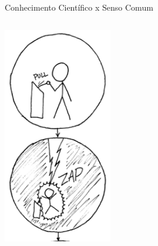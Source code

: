 \documentclass{beamer}
\begin{document}
\begin{frame}{Conhecimento Científico x Senso Comum}
  \begin{columns}
    \begin{column}{5cm}
      \begin{center}
        \includegraphics[width=0.55\textwidth]{Intro/the_difference1}
      \end{center}
    \end{column}
    \begin{column}{5cm}
      \begin{center}
        \begin{center}

\end{center}
\end{center}
\end{column}
\end{columns}
\end{frame}
\end{document}
